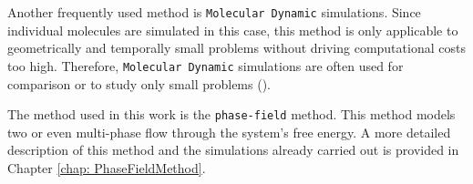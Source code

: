 Another frequently used method is \texttt{Molecular Dynamic} simulations. Since individual molecules are simulated in this case, this method is only applicable to geometrically and temporally small problems without driving computational costs too high. Therefore, \texttt{Molecular Dynamic} simulations are often used for comparison or to study only small problems (\cite{datta2023EarlyStageLiquidInfiltration,lacisNanoscaleShearedDroplet2022,martic2002MolecularDynamicsSimulation,dimitrov2007CapillaryRiseNanopores}).

The method used in this work is the \texttt{phase-field} method. This method models two or even multi-phase flow through the system's free energy. A more detailed description of this method and the simulations already carried out is provided in Chapter \ref{chap: PhaseFieldMethod}. 

